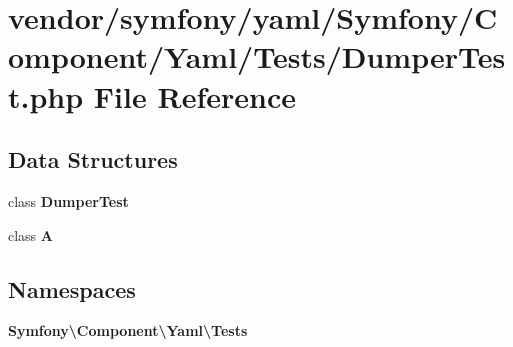 \section{vendor/symfony/yaml/\+Symfony/\+Component/\+Yaml/\+Tests/\+Dumper\+Test.php File Reference}
\label{_dumper_test_8php}
\subsection*{Data Structures}
\begin{DoxyCompactItemize}
\item 
class {\bf Dumper\+Test}
\item 
class {\bf A}
\end{DoxyCompactItemize}
\subsection*{Namespaces}
\begin{DoxyCompactItemize}
\item 
 {\bf Symfony\textbackslash{}\+Component\textbackslash{}\+Yaml\textbackslash{}\+Tests}
\end{DoxyCompactItemize}
